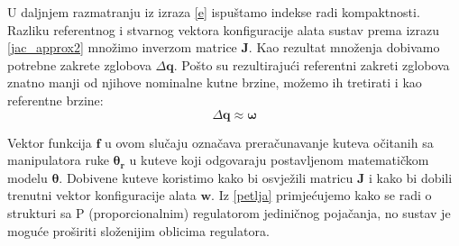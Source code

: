 \documentclass[times, utf8, diplomski, numeric]{fer}
\begin{document}
U daljnjem razmatranju iz izraza \ref{e} ispuštamo indekse radi kompaktnosti.
Razliku referentnog i stvarnog vektora konfiguracije alata sustav prema izrazu \ref{jac_approx2} množimo inverzom matrice $\mathbf{J}$.
Kao rezultat množenja dobivamo potrebne zakrete zglobova $\Delta \mathbf{q}$.
Pošto su rezultirajući referentni zakreti zglobova znatno manji od njihove nominalne kutne brzine, možemo ih tretirati i kao referentne brzine:
\begin{equation}
\Delta \mathbf{q} \approx \bm{\omega}
\end{equation}

Vektor funkcija $\mathbf{f}$ u ovom slučaju označava preračunavanje kuteva očitanih sa manipulatora ruke $\bm{\theta_r}$ u kuteve koji odgovaraju postavljenom matematičkom modelu $\bm{\theta}$. 
Dobivene kuteve koristimo kako bi osvježili matricu $\mathbf{J}$ i kako bi dobili trenutni vektor konfiguracije alata $\mathbf{w}$. 
Iz \ref{petlja} primjećujemo kako se radi o strukturi sa P (proporcionalnim) regulatorom jediničnog pojačanja, no sustav je moguće proširiti složenijim oblicima regulatora. 
\end{document}
